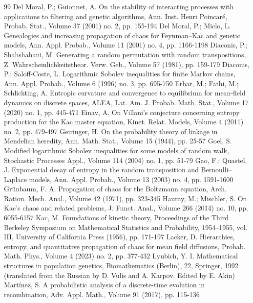 \documentclass[10pt,a4paper]{article}
\begin{document}
\begin{thebibliography}{99}
 Del Moral, P.; Guionnet, A. On the stability of interacting processes with applications to filtering and genetic algorithms, Ann. Inst. Henri Poincaré, Probab. Stat., Volume 37 (2001) no. 2, pp. 155-194
 Del Moral, P.; Miclo, L. Genealogies and increasing propagation of chaos for Feynman–Kac and genetic models, Ann. Appl. Probab., Volume 11 (2001) no. 4, pp. 1166-1198
 Diaconis, P.; Shahshahani, M. Generating a random permutation with random transpositions, Z. Wahrscheinlichkeitstheor. Verw. Geb., Volume 57 (1981), pp. 159-179
 Diaconis, P.; Saloff-Coste, L. Logarithmic Sobolev inequalities for finite Markov chains, Ann. Appl. Probab., Volume 6 (1996) no. 3, pp. 695-750
 Erbar, M.; Fathi, M.; Schlichting, A. Entropic curvature and convergence to equilibrium for mean-field dynamics on discrete spaces, ALEA, Lat. Am. J. Probab. Math. Stat., Volume 17 (2020) no. 1, pp. 445-471
 Einav, A. On Villani’s conjecture concerning entropy production for the Kac master equation, Kinet. Relat. Models, Volume 4 (2011) no. 2, pp. 479-497
 Geiringer, H. On the probability theory of linkage in Mendelian heredity, Ann. Math. Stat., Volume 15 (1944), pp. 25-57
 Goel, S. Modified logarithmic Sobolev inequalities for some models of random walk, Stochastic Processes Appl., Volume 114 (2004) no. 1, pp. 51-79
 Gao, F.; Quastel, J. Exponential decay of entropy in the random transposition and Bernoulli–Laplace models, Ann. Appl. Probab., Volume 13 (2003) no. 4, pp. 1591-1600
 Grünbaum, F. A. Propagation of chaos for the Boltzmann equation, Arch. Ration. Mech. Anal., Volume 42 (1971), pp. 323-345
 Hauray, M.; Mischler, S. On Kac’s chaos and related problems, J. Funct. Anal., Volume 266 (2014) no. 10, pp. 6055-6157
 Kac, M. Foundations of kinetic theory, Proceedings of the Third Berkeley Symposium on Mathematical Statistics and Probability, 1954–1955, vol. III, University of California Press (1956), pp. 171-197
 Lacker, D. Hierarchies, entropy, and quantitative propagation of chaos for mean field diffusions, Probab. Math. Phys., Volume 4 (2023) no. 2, pp. 377-432
 Lyubich, Y. I. Mathematical structures in population genetics, Biomathematics (Berlin), 22, Springer, 1992 (translated from the Russian by D. Vulis and A. Karpov. Edited by E. Akin)
 Martínez, S. A probabilistic analysis of a discrete-time evolution in recombination, Adv. Appl. Math., Volume 91 (2017), pp. 115-136

\end{thebibliography}
\end{document}
